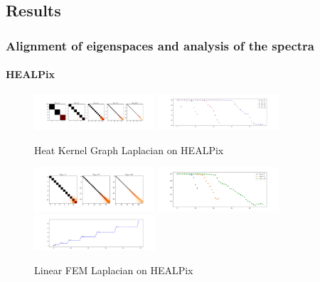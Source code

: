 \subsection{Results}
\label{sec:Chapter3: Results}

\subsubsection{Alignment of eigenspaces and analysis of the spectra}

\paragraph{HEALPix}
\begin{figure}[h]
	\label{fig:HeatKernelGraphLaplacianHealpix}
	\centering
	\includegraphics[width=0.4\textwidth]{../codes/02.HeatKernelGraphLaplacian/HEALPix/06_figures/optimal_thresholded.png}
	\includegraphics[width=0.4\textwidth]{../codes/02.HeatKernelGraphLaplacian/HEALPix/06_figures/optimal_thresholded_diagonal.png}	
	\caption{Heat Kernel Graph Laplacian on HEALPix}
\end{figure}

\begin{figure}[h]
	\label{fig:FEMHealpix}
	\caption{Linear FEM Laplacian on HEALPix}
	\centering
	\includegraphics[width=0.4\textwidth]{../codes/03.FEM_laplacian/HEALPix/img/linearFEM.png}
	\includegraphics[width=0.4\textwidth]{../codes/03.FEM_laplacian/HEALPix/img/linearFEM_diagonal.png}	
	\includegraphics[width=0.4\textwidth]{../codes/03.FEM_laplacian/HEALPix/img/FEM_eigenvalues_16.png}	 
\end{figure}

